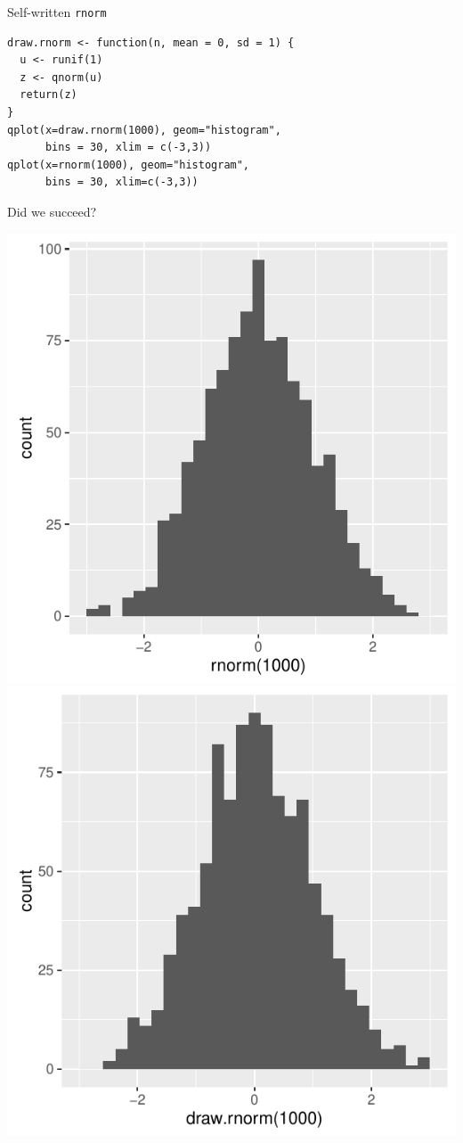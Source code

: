 \documentclass{beamer}
\begin{document}
\begin{frame}[fragile]{Self-written \texttt{rnorm}}

\begin{verbatim}
draw.rnorm <- function(n, mean = 0, sd = 1) {
  u <- runif(1)
  z <- qnorm(u)
  return(z)
}
qplot(x=draw.rnorm(1000), geom="histogram",
      bins = 30, xlim = c(-3,3))
qplot(x=rnorm(1000), geom="histogram",
      bins = 30, xlim=c(-3,3))
\end{verbatim}
\end{frame}

\begin{frame}{Did we succeed?}
\begin{center}
\includegraphics[scale=.5]{figures/rnorm_plot.pdf}
\includegraphics[scale=.5]{figures/draw_rnorm.pdf}
\end{center}
\end{frame}
\end{document}
